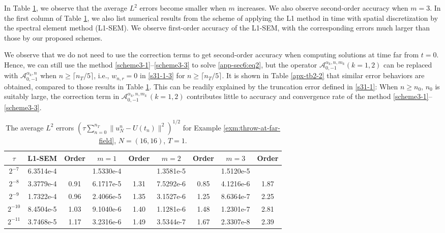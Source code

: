 \documentclass[10pt]{siamltex}
\begin{document}
In Table \ref{apx-tb2-1}, we observe that
the average  $L^2$ errors    become smaller  when $m$ increases.
We also observe second-order accuracy  when   $m=3$.
In the first column of Table \ref{apx-tb2-1}, we also  list numerical results from the scheme
of applying the L1 method in time \cite{JinLaz-etal15,RenSun14} with spatial discretization by the
spectral element method (L1-SEM). We  observe first-order accuracy of the L1-SEM,
with the corresponding errors much larger than those by our proposed schemes.



We observe that  we do not need to use the
correction terms to get second-order accuracy when  computing solutions at time far from $t=0$.
Hence, we can still  use
the method \eqref{scheme3-1}--\eqref{scheme3-3}   to solve \eqref{app-sec6:eq2}, but the operator
$\mathcal{{A}}_{0,-1}^{{\alpha_k},n,m_k}(k=1,2)$ can be replaced with
$\mathcal{{A}}_{0,-1}^{{\alpha_k},n}$  when $n\geq\lceil n_T/5\rceil$, i.e., $w_{n,r}=0$
in \eqref{s31-1-3} for $n\geq\lceil n_T/5\rceil$.
It is shown   in  Table  \ref{apx-tb2-2}
that similar error behaviors are obtained, compared to those results in Table  \ref{apx-tb2-1}.  This can be readily explained by the truncation  error defined in \eqref{s31-1}:
When $n\geq n_0$, $n_0$ is suitably large, the correction term in
$\mathcal{{A}}_{0,-1}^{{\alpha_k},n,m_k}\,(k=1,2)$
contributes little to   accuracy and
convergence rate of  the method \eqref{scheme3-1}--\eqref{scheme3-3}.


\begin{table}[!ht]
\caption{{The  average $L^{2}$ errors $\left(\tau\sum_{n=0}^{n_T}\|u_N^{n}-U(t_n)\|^2\right)^{1/2}$
for Example \ref{exm:throw-at-far-field}, $N=(16,16)$,  {$T=1$}.}}\label{apx-tb2-1}
\centering\footnotesize
\begin{tabular}{|c|c|c|c|c|c|c|c|c|}
\hline
 $\tau$    & L1-SEM & Order & $m=1$ & Order& $m=2$ & Order& $m=3$ & Order \\
 \hline
$2^{-7}$ &6.3514e-4&    &1.5330e-4&    &1.3581e-5&    &1.5120e-5&    \\
$2^{-8}$ &3.3779e-4&0.91&6.1717e-5&1.31&7.5292e-6&0.85&4.1216e-6&1.87\\
$2^{-9}$ &1.7322e-4&0.96&2.4066e-5&1.35&3.1527e-6&1.25&8.6364e-7&2.25\\
$2^{-10}$&8.4504e-5&1.03&9.1040e-6&1.40&1.1281e-6&1.48&1.2301e-7&2.81\\
$2^{-11}$&3.7468e-5&1.17&3.2316e-6&1.49&3.5344e-7&1.67&2.3307e-8&2.39\\
\hline
\end{tabular}
\end{table}
\end{document}
